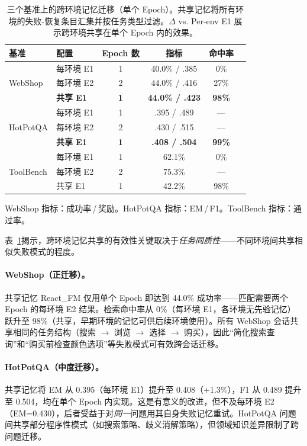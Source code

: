 \documentclass[11pt,a4paper]{article}
\newcommand{\method}{React\_FM}
\begin{document}
\begin{table}[h]
\centering
\caption{三个基准上的跨环境记忆迁移（单个 Epoch）。共享记忆将所有环境的失败-恢复条目汇集并按任务类型过滤。$\Delta$ vs. Per-env E1 展示跨环境共享在单个 Epoch 内的效果。}
\label{tab:cross_env}
\small
\begin{tabular}{llcccc}
\toprule
基准 & 配置 & Epoch 数 & 指标 & 命中率 \\
\midrule
\multirow{3}{*}{WebShop} & 每环境 E1 & 1 & 40.0\% / .385 & 0\% \\
 & 每环境 E2 & 2 & 44.0\% / .416 & 27\% \\
 & \textbf{共享 E1} & \textbf{1} & \textbf{44.0\% / .423} & \textbf{98\%} \\
\midrule
\multirow{3}{*}{HotPotQA} & 每环境 E1 & 1 & .395 / .489 & --- \\
 & 每环境 E2 & 2 & .430 / .515 & --- \\
 & \textbf{共享 E1} & \textbf{1} & \textbf{.408 / .504} & \textbf{99\%} \\
\midrule
\multirow{3}{*}{ToolBench} & 每环境 E1 & 1 & 62.1\% & 0\% \\
 & 每环境 E2 & 2 & 75.3\% & --- \\
 & 共享 E1 & 1 & 42.2\% & 98\% \\
\bottomrule
\end{tabular}
\vspace{0.3em}

{\footnotesize WebShop 指标：成功率\,/\,奖励。HotPotQA 指标：EM\,/\,F1。ToolBench 指标：通过率。}
\end{table}

表~\ref{tab:cross_env}揭示，跨环境记忆共享的有效性关键取决于\emph{任务同质性}——不同环境间共享相似失败模式的程度。

\paragraph{WebShop（正迁移）。} 共享记忆 \method{} 仅用单个 Epoch 即达到 44.0\% 成功率——匹配需要两个 Epoch 的每环境 E2 结果。检索命中率从 0\%（每环境 E1，各环境无先验记忆）跃升至 98\%（共享，早期环境的记忆可供后续环境使用）。所有 WebShop 会话共享相同的任务结构（搜索 $\to$ 浏览 $\to$ 选择 $\to$ 购买），因此``简化搜索查询''和``购买前检查颜色选项''等失败模式可有效跨会话迁移。

\paragraph{HotPotQA（中度迁移）。} 共享记忆将 EM 从 0.395（每环境 E1）提升至 0.408（+1.3\%），F1 从 0.489 提升至 0.504，均在单个 Epoch 内实现。这是有意义的改进，但不及每环境 E2（EM=0.430），后者受益于对\emph{同一}问题用其自身失败记忆重试。HotPotQA 问题间共享部分程序性模式（如搜索策略、歧义消解策略），但领域知识差异限制了跨问题迁移。
\end{document}
